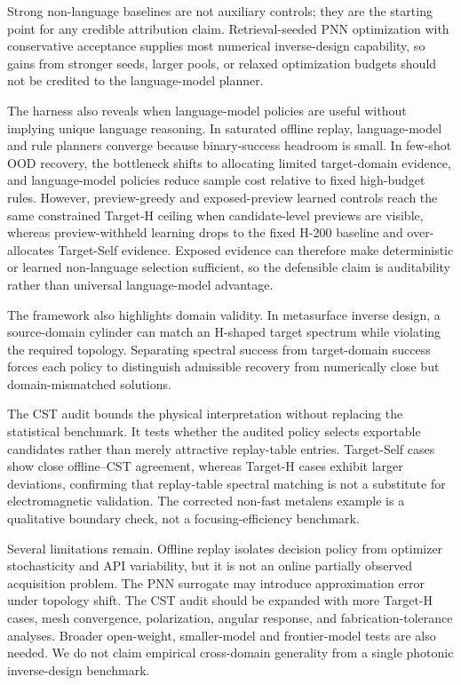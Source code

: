 \documentclass[final,1p,times]{elsarticle}
\begin{document}
Strong non-language baselines are not auxiliary controls; they are the starting point for any credible attribution claim. Retrieval-seeded PNN optimization with conservative acceptance supplies most numerical inverse-design capability, so gains from stronger seeds, larger pools, or relaxed optimization budgets should not be credited to the language-model planner.

The harness also reveals when language-model policies are useful without implying unique language reasoning. In saturated offline replay, language-model and rule planners converge because binary-success headroom is small. In few-shot OOD recovery, the bottleneck shifts to allocating limited target-domain evidence, and language-model policies reduce sample cost relative to fixed high-budget rules. However, preview-greedy and exposed-preview learned controls reach the same constrained Target-H ceiling when candidate-level previews are visible, whereas preview-withheld learning drops to the fixed H-200 baseline and over-allocates Target-Self evidence. Exposed evidence can therefore make deterministic or learned non-language selection sufficient, so the defensible claim is auditability rather than universal language-model advantage.

The framework also highlights domain validity. In metasurface inverse design, a source-domain cylinder can match an H-shaped target spectrum while violating the required topology. Separating spectral success from target-domain success forces each policy to distinguish admissible recovery from numerically close but domain-mismatched solutions.

The CST audit bounds the physical interpretation without replacing the statistical benchmark. It tests whether the audited policy selects exportable candidates rather than merely attractive replay-table entries. Target-Self cases show close offline--CST agreement, whereas Target-H cases exhibit larger deviations, confirming that replay-table spectral matching is not a substitute for electromagnetic validation. The corrected non-fast metalens example is a qualitative boundary check, not a focusing-efficiency benchmark.

Several limitations remain. Offline replay isolates decision policy from optimizer stochasticity and API variability, but it is not an online partially observed acquisition problem. The PNN surrogate may introduce approximation error under topology shift. The CST audit should be expanded with more Target-H cases, mesh convergence, polarization, angular response, and fabrication-tolerance analyses. Broader open-weight, smaller-model and frontier-model tests are also needed. We do not claim empirical cross-domain generality from a single photonic inverse-design benchmark.
\end{document}
